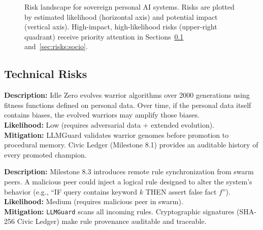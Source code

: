 \documentclass[12pt,a4paper]{article}
\begin{document}
\begin{figure}[H]
\caption{Risk landscape for sovereign personal AI systems. Risks are plotted by estimated
likelihood (horizontal axis) and potential impact (vertical axis). High-impact, high-likelihood
risks (upper-right quadrant) receive priority attention in Sections~\ref{sec:risks:tech}
and~\ref{sec:risks:socio}.}
\label{fig:risks}
\end{figure}

\subsection{Technical Risks}
\label{sec:risks:tech}

\begin{tcolorbox}[riskbox, title={Risk T1: Alignment Drift in Evolved Warriors}]
\textbf{Description:} Idle Zero evolves warrior algorithms over 2000 generations using fitness
functions defined on personal data. Over time, if the personal data itself contains biases,
the evolved warriors may amplify those biases.\\
\textbf{Likelihood:} Low (requires adversarial data + extended evolution).\\
\textbf{Mitigation:} LLMGuard validates warrior genomes before promotion to procedural memory.
Civic Ledger (Milestone 8.1) provides an auditable history of every promoted champion.
\end{tcolorbox}

\begin{tcolorbox}[riskbox, title={Risk T2: Rule Injection via Swarm Synchronization}]
\textbf{Description:} Milestone 8.3 introduces remote rule synchronization from swarm peers.
A malicious peer could inject a logical rule designed to alter the system's behavior
(e.g., ``IF query contains keyword $k$ THEN assert false fact $f$'').\\
\textbf{Likelihood:} Medium (requires malicious peer in swarm).\\
\textbf{Mitigation:} \texttt{LLMGuard} scans all incoming rules. Cryptographic signatures
(SHA-256 Civic Ledger) make rule provenance auditable and traceable.
\end{tcolorbox}
\end{document}
